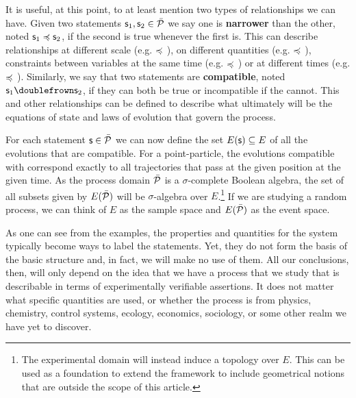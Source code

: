 \documentclass[letterpaper]{article}
\begin{document}
It is useful, at this point, to at least mention two types of relationships we can have. Given two statements $\stmt_1, \stmt_2 \in \tdomain[P]$ we say one is \textbf{narrower} than the other, noted $\stmt_1 \narrower \stmt_2$, if the second is true whenever the first is. This can describe relationships at different scale (e.g.  $\narrower$ ), on different quantities (e.g.  $\narrower$ ), constraints between variables at the same time (e.g.  $\narrower$ ) or at different times (e.g.  $\narrower$ ). Similarly, we say that two statements are \textbf{compatible}, noted $\stmt_1 \comp \stmt_2$, if they can both be true or incompatible if the cannot. This and other relationships can be defined to describe what ultimately will be the equations of state and laws of evolution that govern the process.

For each statement $\stmt \in \tdomain[P]$ we can now define the set $E(\stmt) \subseteq E$ of all the evolutions that are compatible. For a point-particle, the evolutions compatible with  correspond exactly to all trajectories that pass at the given position at the given time. As the process domain $\tdomain[P]$ is a $\sigma$-complete Boolean algebra, the set of all subsets given by $E(\tdomain[P])$ will be $\sigma$-algebra over $E$.\footnote{The experimental domain will instead induce a topology over $E$. This can be used as a foundation to extend the framework to include geometrical notions that are outside the scope of this article.} If we are studying a random process, we can think of $E$ as the sample space and $E(\tdomain[P])$ as the event space.

As one can see from the examples, the properties and quantities for the system typically become ways to label the statements. Yet, they do not form the basis of the basic structure and, in fact, we will make no use of them. All our conclusions, then, will only depend on the idea that we have a process that we study that is describable in terms of experimentally verifiable assertions. It does not matter what specific quantities are used, or whether the process is from physics, chemistry, control systems, ecology, economics, sociology, or some other realm we have yet to discover.
\end{document}
